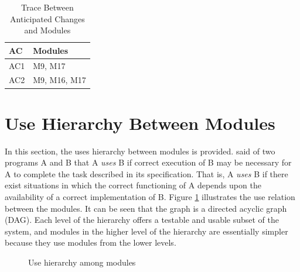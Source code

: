 \documentclass[12pt, titlepage]{article}
\begin{document}
\begin{table}[H]
\centering
\begin{tabular}{p{} p{}}
\toprule
\textbf{AC} & \textbf{Modules}\\
\midrule
AC1 & M9, M17 \\
AC2 & M9, M16, M17 \\
\end{tabular}
\caption{Trace Between Anticipated Changes and Modules}
\label{TblACT}
\end{table}

\section{Use Hierarchy Between Modules} \label{SecUse}

In this section, the uses hierarchy between modules is
provided. \citet{Parnas1978} said of two programs A and B that A {\em uses} B if
correct execution of B may be necessary for A to complete the task described in
its specification. That is, A {\em uses} B if there exist situations in which
the correct functioning of A depends upon the availability of a correct
implementation of B.  Figure \ref{FigUH} illustrates the use relation between
the modules. It can be seen that the graph is a directed acyclic graph
(DAG). Each level of the hierarchy offers a testable and usable subset of the
system, and modules in the higher level of the hierarchy are essentially simpler
because they use modules from the lower levels.



\begin{figure}[H]
\centering
\caption{Use hierarchy among modules}
\label{FigUH}
\end{figure}

\end{document}

